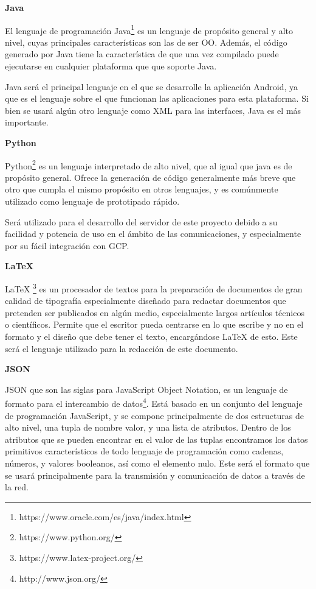 \textbf{Java}

El lenguaje de programación Java\footnote{https://www.oracle.com/es/java/index.html} es un lenguaje de propósito general y alto nivel, cuyas principales características son las de ser \ac{OO}. Además, el código generado por Java tiene la característica de que una vez compilado puede ejecutarse en cualquier plataforma que que soporte Java.

Java será el principal lenguaje en el que se desarrolle la aplicación Android, ya que es el lenguaje sobre el que funcionan las aplicaciones para esta plataforma. Si bien se usará algún otro lenguaje como XML para las interfaces, Java es el más importante.

\textbf{Python}

Python\footnote{https://www.python.org/} es un lenguaje interpretado de alto nivel, que al igual que java es de propósito general. Ofrece la generación de código generalmente más breve que otro que cumpla el mismo propósito en otros lenguajes, y es comúnmente utilizado como lenguaje de prototipado rápido. 

Será utilizado para el desarrollo del servidor de este proyecto debido a su facilidad y potencia de uso en el ámbito de las comunicaciones, y especialmente por su fácil integración con \acf{GCP}.

\textbf{LaTeX}

LaTeX \footnote{https://www.latex-project.org/} es un procesador de textos para la preparación de documentos de gran calidad de tipografía especialmente diseñado para redactar documentos que pretenden ser publicados en algún medio, especialmente largos artículos técnicos o científicos. Permite que el escritor pueda centrarse en lo que escribe y no en el formato y el diseño que debe tener el texto, encargándose LaTeX de esto. Este será el lenguaje utilizado para la redacción de este documento.

\textbf{JSON}

JSON que son las siglas para JavaScript Object Notation, es un lenguaje de formato para el intercambio de datos\footnote{http://www.json.org/}. Está basado en un conjunto del lenguaje de programación JavaScript, y se compone principalmente de dos estructuras de alto nivel, una tupla de nombre valor, y una lista de atributos. Dentro de los atributos que se pueden encontrar en el valor de las tuplas encontramos los datos primitivos característicos de todo lenguaje de programación como cadenas, números, y valores booleanos, así como el elemento nulo. Este será el formato que se usará principalmente para la transmisión y comunicación de datos a través de la red.


